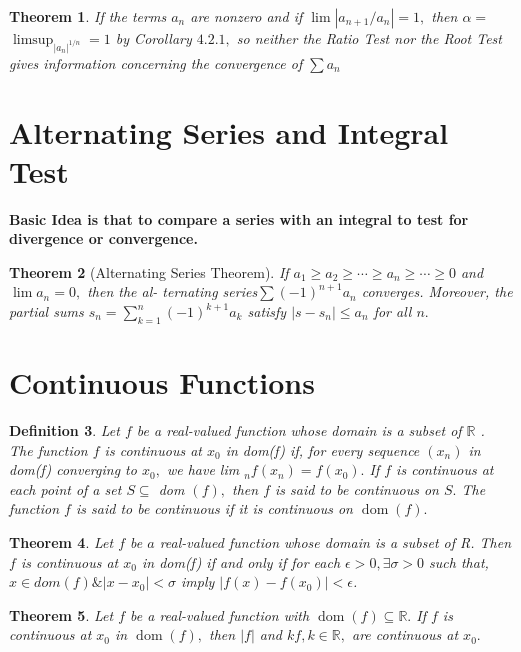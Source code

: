\documentclass[12pt]{article}
\newtheorem{theorem}{Theorem}[section]
\newtheorem{definition}[theorem]{Definition}
\begin{document}
\begin{theorem}
	If the terms $a _ { n }$ are nonzero and if $\lim \left| a _ { n + 1 } / a _ { n } \right| = 1 ,$ then $\alpha =$
	$\limsup _ { \left| a _ { n } \right| ^ { 1 / n } } = 1$ by Corollary $4.2.1 ,$ so neither the Ratio Test nor
	the Root Test gives information concerning the convergence of $\sum a _ { n }$
\end{theorem}

\section{Alternating Series and Integral Test}
\textbf{Basic Idea is that to compare a series with an integral to test for divergence or convergence.}

\begin{theorem}[Alternating Series Theorem]
	If $a _ { 1 } \geq a _ { 2 } \geq \cdots \geq a _ { n } \geq \cdots \geq 0$ and $\lim a _ { n } = 0 ,$ then the al-
	ternating series$\sum ( - 1 ) ^ { n + 1 } a _ { n }$ converges. Moreover, the partial sums
	$s _ { n } = \sum _ { k = 1 } ^ { n } ( - 1 ) ^ { k + 1 } a _ { k }$ satisfy $\left| s - s _ { n } \right| \leq a _ { n }$ for all $n .$
\end{theorem}

\section{Continuous Functions}
\begin{definition}
	Let $f$ be a real-valued function whose domain is a subset of $\mathbb { R }$ . The
	function $f$ is continuous at $x _ { 0 }$ in dom(f) if, for every sequence $\left( x _ { n } \right)$
	in dom(f) converging to $x _ { 0 } ,$ we have lim $_ { n } f \left( x _ { n } \right) = f \left( x _ { 0 } \right) .$ If $f$ is
	continuous at each point of a set $S \subseteq$ dom $( f ) ,$ then $f$ is said to be continuous on $S .$ The function $f$ is said to be continuous if it is
	continuous on $\operatorname { dom } ( f ) .$
\end{definition}
\begin{theorem}
	Let $f$ be $a$ real-valued function whose domain is a subset of R. Then
	$f$ is continuous at $x _ { 0 }$ in dom(f) if and only if for each $\epsilon > 0, \exists \sigma > 0$ such that, $x \in dom(f) \& |x - x_0| < \sigma$ imply $|f(x) - f(x_0)|< \epsilon$.
\end{theorem}

\begin{theorem}
	Let $f$ be a real-valued function with $\operatorname { dom } ( f ) \subseteq \mathbb { R } .$ If $f$ is continuous
	at $x _ { 0 }$ in $\operatorname { dom } ( f ) ,$ then $| f |$ and $k f , k \in \mathbb { R } ,$ are continuous at $x _ { 0 } .$
\end{theorem}
\end{document}
